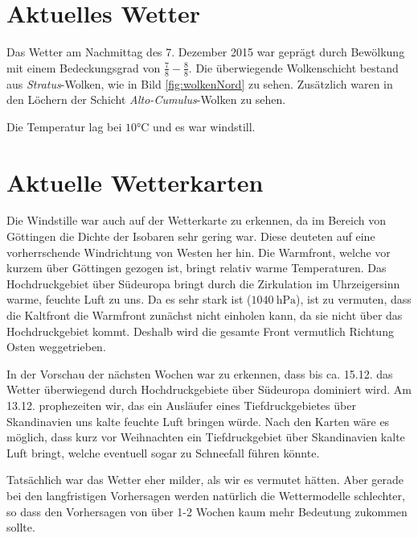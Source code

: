 \documentclass[12pt,a4paper,titlepage,headinclude,bibtotoc]{scrartcl}
\begin{document}
\section{Aktuelles Wetter}
Das Wetter am Nachmittag des 7. Dezember 2015 war geprägt durch Bewölkung mit einem Bedeckungsgrad von $\frac{7}{8}-\frac{8}{8}$.
Die überwiegende Wolkenschicht bestand aus \textit{Stratus}-Wolken, wie in Bild \ref{fig:wolkenNord} zu sehen.
Zusätzlich waren in den Löchern der Schicht \textit{Alto-Cumulus}-Wolken zu sehen.

Die Temperatur lag bei $10\si\celsius$ und es war windstill.


\section{Aktuelle Wetterkarten}
Die Windstille war auch auf der Wetterkarte zu erkennen, da im Bereich von Göttingen die Dichte der Isobaren sehr gering war.
Diese deuteten auf eine vorherrschende Windrichtung von Westen her hin.
Die Warmfront, welche vor kurzem über Göttingen gezogen ist, bringt relativ warme Temperaturen.
Das Hochdruckgebiet über Südeuropa bringt durch die Zirkulation im Uhrzeigersinn warme, feuchte Luft zu uns.
Da es sehr stark ist ($\SI{1040}{\hecto\pascal}$), ist zu vermuten, dass die Kaltfront die Warmfront zunächst nicht einholen kann, da sie nicht über das Hochdruckgebiet kommt.
Deshalb wird die gesamte Front vermutlich Richtung Osten weggetrieben.

In der Vorschau der nächsten Wochen war zu erkennen, dass bis ca. 15.12. das Wetter überwiegend durch Hochdruckgebiete über Südeuropa dominiert wird.
Am 13.12. prophezeiten wir, das ein Ausläufer eines Tiefdruckgebietes über Skandinavien uns kalte feuchte Luft bringen würde.
Nach den Karten wäre es möglich, dass kurz vor Weihnachten ein Tiefdruckgebiet über Skandinavien kalte Luft bringt, welche eventuell sogar zu Schneefall führen könnte.

Tatsächlich war das Wetter eher milder, als wir es vermutet hätten.
Aber gerade bei den langfristigen Vorhersagen werden natürlich die Wettermodelle schlechter, so dass den Vorhersagen von über 1-2 Wochen kaum mehr Bedeutung zukommen sollte.
\end{document}
